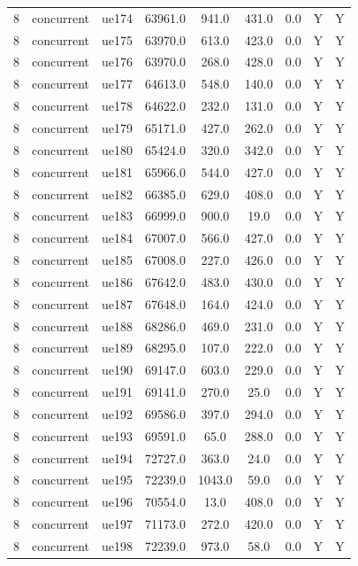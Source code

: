 \begin{table}[ht]
\begin{tabular}{|c|c|c|c|c|c|c|c|c|}
8 & concurrent & ue174 & 63961.0 & 941.0 & 431.0 & 0.0 & Y & Y \\
8 & concurrent & ue175 & 63970.0 & 613.0 & 423.0 & 0.0 & Y & Y \\
8 & concurrent & ue176 & 63970.0 & 268.0 & 428.0 & 0.0 & Y & Y \\
8 & concurrent & ue177 & 64613.0 & 548.0 & 140.0 & 0.0 & Y & Y \\
8 & concurrent & ue178 & 64622.0 & 232.0 & 131.0 & 0.0 & Y & Y \\
8 & concurrent & ue179 & 65171.0 & 427.0 & 262.0 & 0.0 & Y & Y \\
8 & concurrent & ue180 & 65424.0 & 320.0 & 342.0 & 0.0 & Y & Y \\
8 & concurrent & ue181 & 65966.0 & 544.0 & 427.0 & 0.0 & Y & Y \\
8 & concurrent & ue182 & 66385.0 & 629.0 & 408.0 & 0.0 & Y & Y \\
8 & concurrent & ue183 & 66999.0 & 900.0 & 19.0 & 0.0 & Y & Y \\
8 & concurrent & ue184 & 67007.0 & 566.0 & 427.0 & 0.0 & Y & Y \\
8 & concurrent & ue185 & 67008.0 & 227.0 & 426.0 & 0.0 & Y & Y \\
8 & concurrent & ue186 & 67642.0 & 483.0 & 430.0 & 0.0 & Y & Y \\
8 & concurrent & ue187 & 67648.0 & 164.0 & 424.0 & 0.0 & Y & Y \\
8 & concurrent & ue188 & 68286.0 & 469.0 & 231.0 & 0.0 & Y & Y \\
8 & concurrent & ue189 & 68295.0 & 107.0 & 222.0 & 0.0 & Y & Y \\
8 & concurrent & ue190 & 69147.0 & 603.0 & 229.0 & 0.0 & Y & Y \\
8 & concurrent & ue191 & 69141.0 & 270.0 & 25.0 & 0.0 & Y & Y \\
8 & concurrent & ue192 & 69586.0 & 397.0 & 294.0 & 0.0 & Y & Y \\
8 & concurrent & ue193 & 69591.0 & 65.0 & 288.0 & 0.0 & Y & Y \\
8 & concurrent & ue194 & 72727.0 & 363.0 & 24.0 & 0.0 & Y & Y \\
8 & concurrent & ue195 & 72239.0 & 1043.0 & 59.0 & 0.0 & Y & Y \\
8 & concurrent & ue196 & 70554.0 & 13.0 & 408.0 & 0.0 & Y & Y \\
8 & concurrent & ue197 & 71173.0 & 272.0 & 420.0 & 0.0 & Y & Y \\
8 & concurrent & ue198 & 72239.0 & 973.0 & 58.0 & 0.0 & Y & Y \\

\end{tabular}
\end{table}
